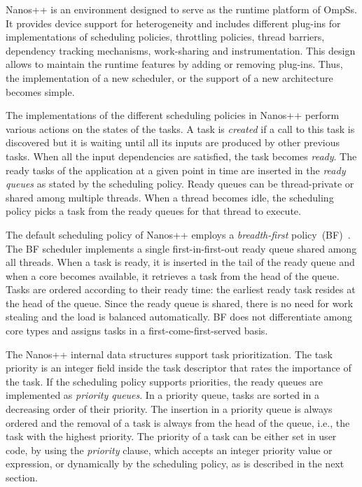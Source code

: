 {Nanos++ is an environment designed to serve as the runtime platform of OmpSs. 
It provides device support for heterogeneity and includes different plug-ins for implementations of scheduling policies, throttling policies, thread barriers, dependency tracking mechanisms, work-sharing and instrumentation. 
This design allows to maintain the runtime features by adding or removing plug-ins. 
Thus, the implementation of a new scheduler, or the support of a new architecture becomes simple.

The implementations of the different scheduling policies in Nanos++ perform various actions on the states of the tasks. 
A task is \textit{created} if a call to this task is discovered but it is waiting until all its inputs are produced by other previous tasks. 
When all the input dependencies are satisfied, the task becomes \textit{ready}. 
The ready tasks of the application at a given point in time are inserted in the \textit{ready queues} as stated by the scheduling policy. 
Ready queues can be thread-private or shared among multiple threads. 
When a thread becomes idle, the scheduling policy picks a task from the ready queues for that thread to execute. 

The default scheduling policy of Nanos++ employs a \textit{breadth-first} policy~(BF)~\cite{Duran_schedulers_08}. 
The BF scheduler implements a single first-in-first-out ready queue shared among all threads. 
When a task is ready, it is inserted in the tail of the ready queue and when a core becomes available, it retrieves a task from the head of the queue. 
Tasks are ordered according to their ready time: the earliest ready task resides at the head of the queue. 
Since the ready queue is shared, there is no need for work stealing and the load is balanced automatically. 
BF does not differentiate among core types and assigns tasks in a first-come-first-served basis.

The Nanos++ internal data structures support task prioritization. 
The task priority is an integer field inside the task descriptor that rates the importance of the task. 
If the scheduling policy supports priorities, the ready queues are implemented as \textit{priority queues}. 
In a priority queue, tasks are sorted in a decreasing order of their priority. 
The insertion in a priority queue is always ordered and the removal of a task is always from the head of the queue, i.e., the task with the highest priority. 
The priority of a task can be either set in user code, by using the \textit{priority} clause, which accepts an integer priority value or expression, or dynamically  by the scheduling policy, as is described in the next section.



}
